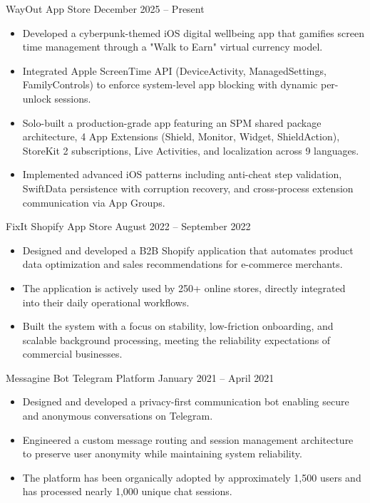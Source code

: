 \resumeProject
  {WayOut}
  {App Store}
  {}
  {December 2025 -- Present}
\begin{itemize}
  \item Developed a cyberpunk-themed iOS digital wellbeing app that gamifies screen time management through a "Walk to Earn" virtual currency model.
  \item Integrated Apple ScreenTime API (DeviceActivity, ManagedSettings, FamilyControls) to enforce system-level app blocking with dynamic per-unlock sessions.
  \item Solo-built a production-grade app featuring an SPM shared package architecture, 4 App Extensions (Shield, Monitor, Widget, ShieldAction), StoreKit 2 subscriptions, Live Activities, and localization across 9 languages.
  \item Implemented advanced iOS patterns including anti-cheat step validation, SwiftData persistence with corruption recovery, and cross-process extension communication via App Groups.
\end{itemize}
\vspace{0.25em}

\resumeProject
  {FixIt}
  {Shopify App Store}
  {}
  {August 2022 -- September 2022}
\begin{itemize}
  \item Designed and developed a B2B Shopify application that automates product data optimization and sales recommendations for e-commerce merchants.
  \item The application is actively used by 250+ online stores, directly integrated into their daily operational workflows.
  \item Built the system with a focus on stability, low-friction onboarding, and scalable background processing, meeting the reliability expectations of commercial businesses.
\end{itemize}
\vspace{0.25em}

\resumeProject
  {Messagine Bot}
  {Telegram Platform}
  {}
  {January 2021 -- April 2021}
\begin{itemize}
  \item Designed and developed a privacy-first communication bot enabling secure and anonymous conversations on Telegram.
  \item Engineered a custom message routing and session management architecture to preserve user anonymity while maintaining system reliability.
  \item The platform has been organically adopted by approximately 1,500 users and has processed nearly 1,000 unique chat sessions.
\end{itemize}
